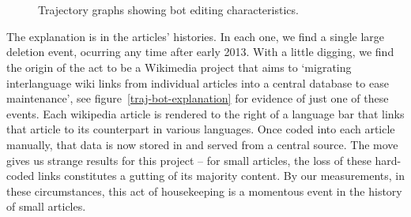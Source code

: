 \begin{figure}
{  }\\
  \\
  \caption{Trajectory graphs showing bot editing characteristics.}
  \label{fig:traj-bot}
\end{figure}

The explanation is in the articles' histories. In each one, we find a
single large deletion event, ocurring any time after early 2013. With
a little digging, we find the origin of the act to be a Wikimedia
project that aims to `migrating interlanguage wiki links from
individual articles into a central database to ease
maintenance',\cite{wiki-interwikilinks} see
figure~\ref{traj-bot-explanation} for evidence of just one of these
events. Each wikipedia article is rendered to the right of a language
bar that links that article to its counterpart in various
languages. Once coded into each article manually, that data is now
stored in and served from a central source.\cite{wiki-blog-onwikidata}
The move gives us strange results for this project -- for small
articles, the loss of these hard-coded links constitutes a gutting of
its majority content. By our measurements, in these circumstances,
this act of housekeeping is a momentous event in the history of small
articles.

